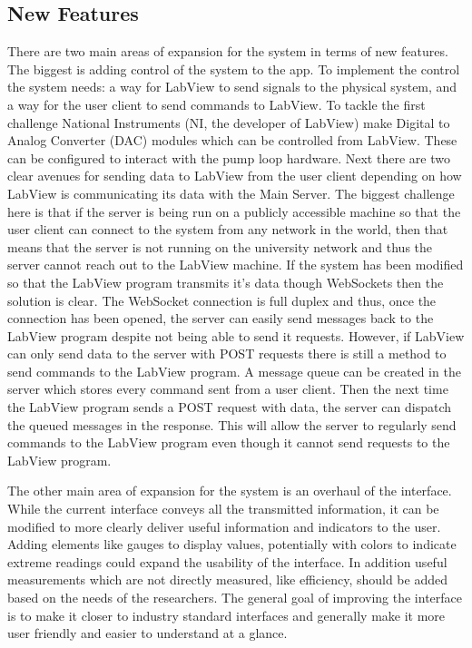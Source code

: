 \documentclass[10pt,technote]{IEEEtran}
\begin{document}
\subsection{New Features}
There are two main areas of expansion for the system in terms of new features. The biggest is adding control of the system to the app. To implement the control the system needs: a way for LabView to send signals to the physical system, and a way for the user client to send commands to LabView. To tackle the first challenge National Instruments (NI, the developer of LabView) make Digital to Analog Converter (DAC) modules which can be controlled from LabView. These can be configured to interact with the pump loop hardware. Next there are two clear avenues for sending data to LabView from the user client depending on how LabView is communicating its data with the Main Server. The biggest challenge here is that if the server is being run on a publicly accessible machine so that the user client can connect to the system from any network in the world, then that means that the server is not running on the university network and thus the server cannot reach out to the LabView machine. If the system has been modified so that the LabView program transmits it's data though WebSockets then the solution is clear. The WebSocket connection is full duplex and thus, once the connection has been opened, the server can easily send messages back to the LabView program despite not being able to send it requests. However, if LabView can only send data to the server with POST requests there is still a method to send commands to the LabView program. A message queue can be created in the server which stores every command sent from a user client. Then the next time the LabView program sends a POST request with data, the server can dispatch the queued messages in the response. This will allow the server to regularly send commands to the LabView program even though it cannot send requests to the LabView program.
\par
The other main area of expansion for the system is an overhaul of the interface. While the current interface conveys all the transmitted information, it can be modified to more clearly deliver useful information and indicators to the user. Adding elements like gauges to display values, potentially with colors to indicate extreme readings could expand the usability of the interface. In addition useful measurements which are not directly measured, like efficiency, should be added based on the needs of the researchers. The general goal of improving the interface is to make it closer to industry standard interfaces and generally make it more user friendly and easier to understand at a glance.
\end{document}

